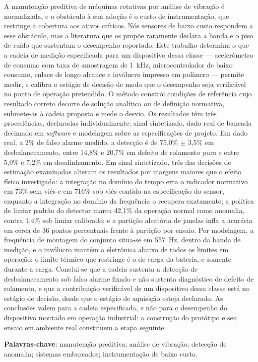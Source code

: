 
\begin{resumo}
A manutenção preditiva de máquinas rotativas por análise de vibração é normalizada, e o
obstáculo à sua adoção é o custo de instrumentação, que restringe a cobertura aos ativos
críticos. Nós sensores de baixo custo respondem a esse obstáculo, mas a literatura que os
propõe raramente declara a banda e o piso de ruído que sustentam o desempenho reportado.
Este trabalho determina o que a cadeia de medição especificada para um dispositivo dessa
classe --- acelerômetro de consumo com taxa de amostragem de 1~kHz, microcontrolador de
baixo consumo, enlace de longo alcance e invólucro impresso em polímero --- permite medir,
e calibra o estágio de decisão de modo que o desempenho seja verificável no ponto de
operação pretendido. O método constrói condições de referência cujo resultado correto
decorre de solução analítica ou de definição normativa, submete-as à cadeia proposta e mede
o desvio. Os resultados têm três procedências, declaradas individualmente: sinal
sintetizado, dado real de bancada decimado em \emph{software} e modelagem sobre as
especificações de projeto. Em dado real, a 2\% de falso alarme medido, a detecção é de
75,0\% $\pm$ 3,5\% em desbalanceamento, entre 14,8\% e 20,7\% em defeito de rolamento puro
e entre 5,0\% e 7,2\% em desalinhamento. Em sinal sintetizado, três das decisões de estimação examinadas
alteram os resultados por margens maiores que o efeito físico investigado: a integração no
domínio do tempo erra o indicador normativo em 73\% sem viés e em 716\% sob viés contido na
especificação do sensor, enquanto a integração no domínio da frequência o recupera
exatamente; a política de limiar padrão do detector marca 42,1\% da operação normal como
anomalia, contra 1,4\% sob limiar calibrado; e a partição aleatória de janelas infla a
acurácia em cerca de 36 pontos percentuais frente à partição por ensaio. Por modelagem, a
frequência de montagem do conjunto situa-se em 557~Hz, dentro da banda de medição, e o
invólucro mantém a eletrônica abaixo de todos os limites em operação; o limite térmico
que restringe é o de carga da bateria, e somente durante a carga. Conclui-se que a
cadeia sustenta a detecção de desbalanceamento sob falso alarme fixado e não sustenta
diagnóstico de defeito de rolamento, e que a contribuição verificável de um dispositivo
dessa classe está no estágio de decisão, desde que o estágio de aquisição esteja declarado.
As conclusões valem para a cadeia especificada, e não para o desempenho do dispositivo
montado em operação industrial: a construção do protótipo e seu ensaio em ambiente real
constituem a etapa seguinte.

\vspace{\onelineskip}
\noindent
\textbf{Palavras-chave}: manutenção preditiva; análise de vibração; detecção de anomalia;
sistemas embarcados; instrumentação de baixo custo.
\end{resumo}
